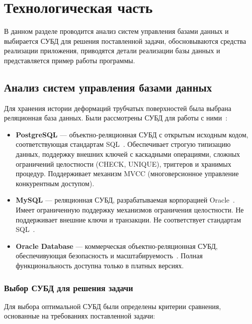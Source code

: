 \section{Технологическая часть}

\noindent
\hspace{1.25cm}
В данном разделе проводится анализ систем управления базами данных и выбирается СУБД для решения поставленной задачи, обосновываются средства реализации приложения, приводятся детали реализации базы данных и представляется пример работы программы.

\subsection{Анализ систем управления базами данных}

\noindent
\hspace{1.25cm}
Для хранения истории деформаций трубчатых поверхностей была выбрана реляционная база данных. Были рассмотрены СУБД для работы с ними~\cite{vas_hus}:

\begin{itemize}
    \item \textbf{PostgreSQL} --- объектно-реляционная СУБД с открытым исходным кодом, соответствующая стандартам SQL~\cite{vas_hus}. Обеспечивает строгую типизацию данных, поддержку внешних ключей с каскадными операциями, сложных ограничений целостности (CHECK, UNIQUE), триггеров и хранимых процедур. Поддерживает механизм MVCC (многоверсионное управление конкурентным доступом).
    
    \item \textbf{MySQL} --- реляционная СУБД, разрабатываемая корпорацией Oracle~\cite{mysql}. Имеет ограниченную поддержку механизмов ограничения целостности. Не поддерживает внешние ключи и транзакции. Не соответствует стандартам SQL~\cite{mysql}.
    
    \item \textbf{Oracle Database} --- коммерческая объектно-реляционная СУБД, обеспечивующая безопасность и масштабируемость~\cite{oracle}. Полная функциональность доступна только в платных версиях.
\end{itemize}

\subsubsection{Выбор СУБД для решения задачи}

\noindent
\hspace{1.25cm}
Для выбора оптимальной СУБД были определены критерии сравнения, основанные на требованиях поставленной задачи:

